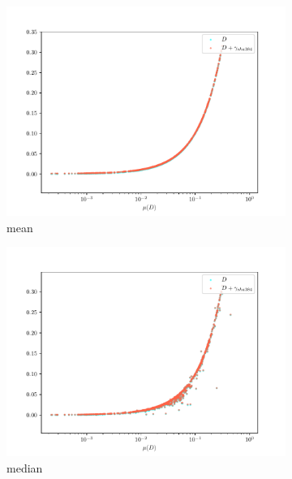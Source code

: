 \documentclass[12pt,a4paper,automark, toc=bib]{scrreprt}
\theoremstyle{definition}
\begin{document}
		\begin{figure}
			\begin{subfigure}{0.32\linewidth}
				\includegraphics[width=\linewidth]{figures/stat_sha384_0mean.pdf}
				\caption{mean}
			\end{subfigure}
			\begin{subfigure}{0.32\linewidth}
				\includegraphics[width=\linewidth]{figures/stat_sha384_0median.pdf}
				\caption{median}
			\end{subfigure}
			\begin{subfigure}{0.32\linewidth}

\end{subfigure}
\end{figure}
\end{document}
